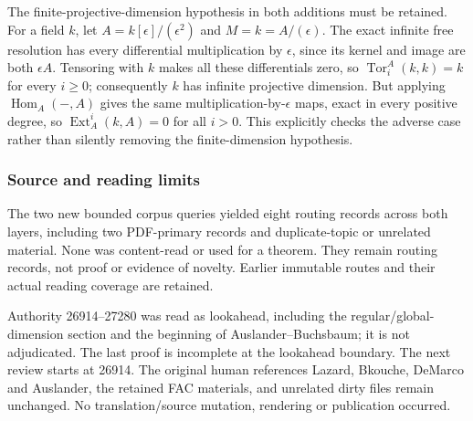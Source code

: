The finite-projective-dimension hypothesis in both additions must be retained. For a field \(k\), let \(A=k[\epsilon]/(\epsilon^2)\) and \(M=k=A/(\epsilon)\). The exact infinite free resolution has every differential multiplication by \(\epsilon\), since its kernel and image are both \(\epsilon A\). Tensoring with \(k\) makes all these differentials zero, so \(\operatorname{Tor}^A_i(k,k)=k\) for every \(i\ge0\); consequently \(k\) has infinite projective dimension. But applying \(\operatorname{Hom}_A(-,A)\) gives the same multiplication-by-\(\epsilon\) maps, exact in every positive degree, so \(\operatorname{Ext}_A^i(k,A)=0\) for all \(i>0\). This explicitly checks the adverse case rather than silently removing the finite-dimension hypothesis.

\subsubsection{Source and reading limits}\label{source-and-reading-limits}

The two new bounded corpus queries yielded eight routing records across both layers, including two PDF-primary records and duplicate-topic or unrelated material. None was content-read or used for a theorem. They remain routing records, not proof or evidence of novelty. Earlier immutable routes and their actual reading coverage are retained.

Authority 26914--27280 was read as lookahead, including the regular/global-dimension section and the beginning of Auslander--Buchsbaum; it is not adjudicated. The last proof is incomplete at the lookahead boundary. The next review starts at 26914. The original human references Lazard, Bkouche, DeMarco and Auslander, the retained FAC materials, and unrelated dirty files remain unchanged. No translation/source mutation, rendering or publication occurred.
